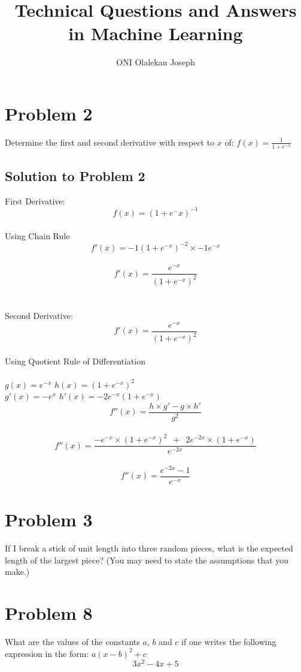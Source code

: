 \documentclass{article}
\begin{document}
\title{Technical Questions and Answers in Machine Learning}
\author{ONI Olalekan Joseph}

\maketitle

\section{Problem 2}
Determine the first and second derivative with respect to $x$ of: $f(x)= \frac{1}{1 + e^{-x}} $

\subsection{Solution to Problem 2}
 First Derivative: \\
 $$f(x) = (1 + e^-x)^{-1}$$ \\
 Using Chain Rule \\
 $$f'(x) = -1(1 + e^{-x})^{-2} \times -1e^{-x}$$ \\
 $$f'(x) = \frac{e^{-x}}{(1 + e^{-x})^{2}}$$ \\ \\
 
\noindent Second Derivative:  \\
 $$f'(x) = \frac{e^{-x}}{(1 + e^{-x})^{2}}$$ \\
 Using Quotient Rule of Differentiation \\ \\
 $g(x) = e^{-x}$  \qquad  $h(x) = (1 + e^{-x})^{2} $ \\
 $ g'(x) = -e^{x} $ \qquad $h'(x) = -2e^{-x}(1 + e^{-x}) $ \\
 $$f''(x) = \frac{h \times g' - g \times h' }{g^2} $$ \\
 $$f''(x) = \frac{-e^{-x} \times (1 + e^{-x})^{2} \enspace + \enspace 2e^{-2x} \times (1 + e^{-x})}{e^{-2x}} $$\\
 $$f''(x) = \frac{e^{-2x} - 1}{e^{-x}} $$
 
\section{Problem 3}
 If I break a stick of unit length into three random pieces, what is the expected length of the largest piece? (You may need to state the assumptions that you make.)

\section{Problem 8}
What are the values of the constants $a$, $b$ and $c$ if one writes the following expression in the form: $ a(x - b)^{2} + c$ \\
 \begin{equation}\label{key}
 3x^{2} - 4x + 5
 \end{equation}
 
\end{document}
